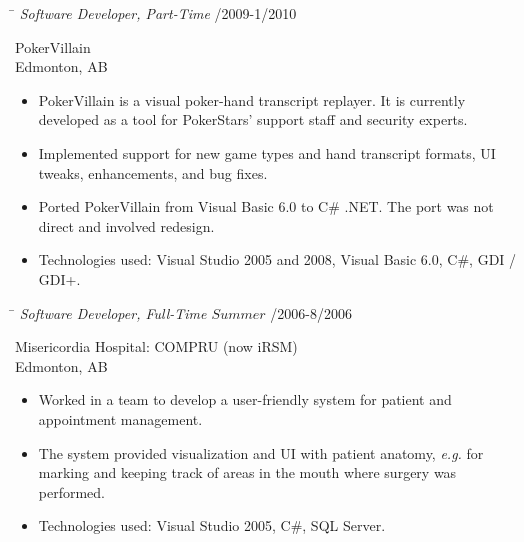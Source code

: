 \documentclass{res}
\begin{document}
\begin{resume}
    \vspace{-0.1in}
    \begin{tabbing}
    \hspace{5.15in}\= \kill  %
    \textit{Software Developer, Part-Time} /2009-1/2010
    \end{tabbing}\vspace{-22pt}  %
    PokerVillain\\
    Edmonton, AB\\
    \vspace{-2.5ex}\begin{itemize}[noitemsep]
    \item PokerVillain is a visual poker-hand transcript replayer.  It is currently developed as a tool for PokerStars' support staff and security experts.
    \item Implemented support for new game types and hand transcript formats, UI tweaks, enhancements, and bug fixes.
    \item Ported PokerVillain from Visual Basic 6.0 to C\# .NET.  The port was not direct and involved redesign.
    \item Technologies used: Visual Studio 2005 and 2008, Visual Basic 6.0, C\#, GDI / GDI+.
    \end{itemize}

    \vspace{-0.1in}
    \begin{tabbing}
    \hspace{5.15in}\= \kill  %
    \textit{Software Developer, Full-Time \(Summer\)} /2006-8/2006
    \end{tabbing}\vspace{-22pt}  %
    Misericordia Hospital: COMPRU (now iRSM)\\
    Edmonton, AB\\
    \vspace{-2.5ex}\begin{itemize}[noitemsep]
    \item Worked in a team to develop a user-friendly system for patient and appointment management.
    \item The system provided visualization and UI with patient anatomy, \textit{e.g.} for marking and keeping track of areas in the mouth where surgery was performed.
    \item Technologies used: Visual Studio 2005, C\#, SQL Server.
    \end{itemize}



\end{resume}
\end{document}
